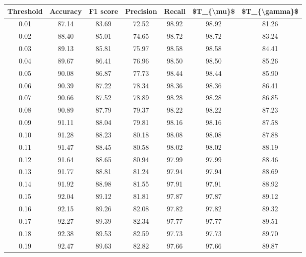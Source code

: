 \begin{tabular}{|c|c|c|c|c|c|c|}
\hline
 Threshold &  Accuracy &  F1 score &  Precision &  Recall &  \$T\_\{\textbackslash mu\}\$ &  \$T\_\{\textbackslash gamma\}\$ \\
\hline
      0.01 &     87.14 &     83.69 &      72.52 &   98.92 &      98.92 &         81.26 \\
      0.02 &     88.40 &     85.01 &      74.65 &   98.72 &      98.72 &         83.24 \\
      0.03 &     89.13 &     85.81 &      75.97 &   98.58 &      98.58 &         84.41 \\
      0.04 &     89.67 &     86.41 &      76.96 &   98.50 &      98.50 &         85.26 \\
      0.05 &     90.08 &     86.87 &      77.73 &   98.44 &      98.44 &         85.90 \\
      0.06 &     90.39 &     87.22 &      78.34 &   98.36 &      98.36 &         86.41 \\
      0.07 &     90.66 &     87.52 &      78.89 &   98.28 &      98.28 &         86.85 \\
      0.08 &     90.89 &     87.79 &      79.37 &   98.22 &      98.22 &         87.23 \\
      0.09 &     91.11 &     88.04 &      79.81 &   98.16 &      98.16 &         87.58 \\
      0.10 &     91.28 &     88.23 &      80.18 &   98.08 &      98.08 &         87.88 \\
      0.11 &     91.47 &     88.45 &      80.58 &   98.02 &      98.02 &         88.19 \\
      0.12 &     91.64 &     88.65 &      80.94 &   97.99 &      97.99 &         88.46 \\
      0.13 &     91.77 &     88.81 &      81.24 &   97.94 &      97.94 &         88.69 \\
      0.14 &     91.92 &     88.98 &      81.55 &   97.91 &      97.91 &         88.92 \\
      0.15 &     92.04 &     89.12 &      81.81 &   97.87 &      97.87 &         89.12 \\
      0.16 &     92.15 &     89.26 &      82.08 &   97.82 &      97.82 &         89.32 \\
      0.17 &     92.27 &     89.39 &      82.34 &   97.77 &      97.77 &         89.51 \\
      0.18 &     92.38 &     89.53 &      82.59 &   97.73 &      97.73 &         89.70 \\
      0.19 &     92.47 &     89.63 &      82.82 &   97.66 &      97.66 &         89.87 \\

\end{tabular}
